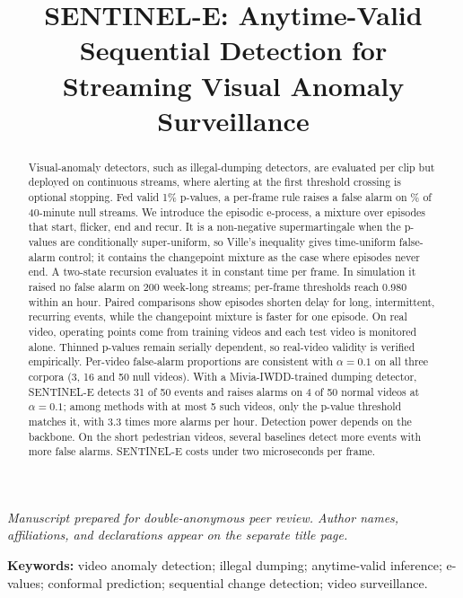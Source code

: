 \documentclass[11pt,a4paper]{article}
\title{\textbf{SENTINEL-E}: Anytime-Valid Sequential Detection for\\
       Streaming Visual Anomaly Surveillance}
\author{}
\date{}
\theoremstyle{plain}
\theoremstyle{definition}
\begin{document}
\maketitle
\thispagestyle{empty}
\begin{center}
  \emph{Manuscript prepared for double-anonymous peer review. Author names,
  affiliations, and declarations appear on the separate title page.}
\end{center}
\vspace{0.5em}

\begin{abstract}
\noindent
Visual-anomaly detectors, such as illegal-dumping detectors, are evaluated per clip but deployed on continuous streams, where alerting at the first threshold crossing is optional stopping. Fed valid 1\% p-values, a per-frame rule raises a false alarm on \ValidityPfaPvaluePct\% of 40-minute null streams. We introduce the episodic e-process, a mixture over episodes that start, flicker, end and recur. It is a non-negative supermartingale when the p-values are conditionally super-uniform, so Ville's inequality gives time-uniform false-alarm control; it contains the changepoint mixture as the case where episodes never end. A two-state recursion evaluates it in constant time per frame. In simulation it raised no false alarm on 200 week-long streams; per-frame thresholds reach 0.980 within an hour. Paired comparisons show episodes shorten delay for long, intermittent, recurring events, while the changepoint mixture is faster for one episode. On real video, operating points come from training videos and each test video is monitored alone. Thinned p-values remain serially dependent, so real-video validity is verified empirically. Per-video false-alarm proportions are consistent with $\alpha=0.1$ on all three corpora (3, 16 and 50 null videos). With a Mivia-IWDD-trained dumping detector, SENTINEL-E detects 31 of 50 events and raises alarms on 4 of 50 normal videos at $\alpha=0.1$; among methods with at most 5 such videos, only the p-value threshold matches it, with 3.3 times more alarms per hour. Detection power depends on the backbone. On the short pedestrian videos, several baselines detect more events with more false alarms. SENTINEL-E costs under two microseconds per frame.
\end{abstract}

\vspace{0.5em}
\noindent\textbf{Keywords:} video anomaly detection; illegal dumping; anytime-valid inference; e-values; conformal prediction; sequential change detection; video surveillance.
\end{document}
